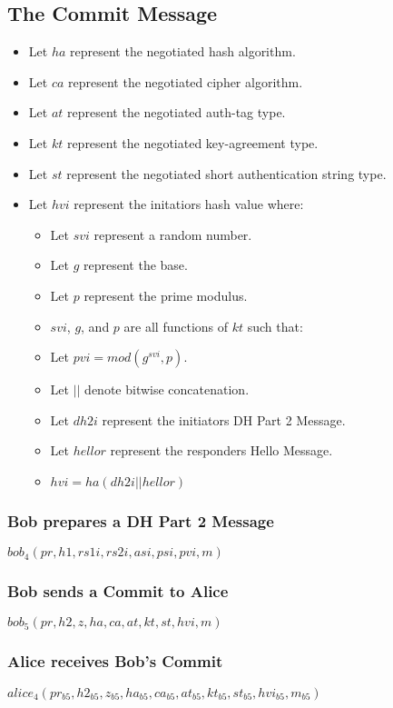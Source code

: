 \documentclass[11pt]{article}
\begin{document}
  \subsection{The Commit Message}
  \begin{itemize}
    \item Let $ha$ represent the negotiated hash algorithm.
    \item Let $ca$ represent the negotiated cipher algorithm.
    \item Let $at$ represent the negotiated auth-tag type.
    \item Let $kt$ represent the negotiated key-agreement type.
    \item Let $st$ represent the negotiated short authentication
            string type.
    \item Let $hvi$ represent the initatiors hash value where:
      \begin{itemize}
        \item Let $svi$ represent a random number.
        \item Let $g$ represent the base.
        \item Let $p$ represent the prime modulus.
        \item $svi$, $g$, and $p$ are all functions of $kt$
              such that: 
        \item Let $pvi = mod(g^{svi},p)$.
        \item Let $||$ denote bitwise concatenation.
        \item Let $dh2i$ represent the initiators DH Part 2 Message.
        \item Let $hellor$ represent the responders Hello Message.
        \item $hvi = ha(dh2i || hellor)$
      \end{itemize}
  \end{itemize}
  \subsubsection{Bob prepares a DH Part 2 Message}
  $bob_4(pr,h1,rs1i,rs2i,asi,psi,pvi,m)$
  \subsubsection{Bob sends a Commit to Alice}
  $bob_5(pr,h2,z,ha,ca,at,kt,st,hvi,m)$
  \subsubsection{Alice receives Bob's Commit}
  $alice_4(pr_{b5},h2_{b5},z_{b5},ha_{b5},ca_{b5},at_{b5},kt_{b5}
    ,st_{b5},hvi_{b5},m_{b5})$
\end{document}
